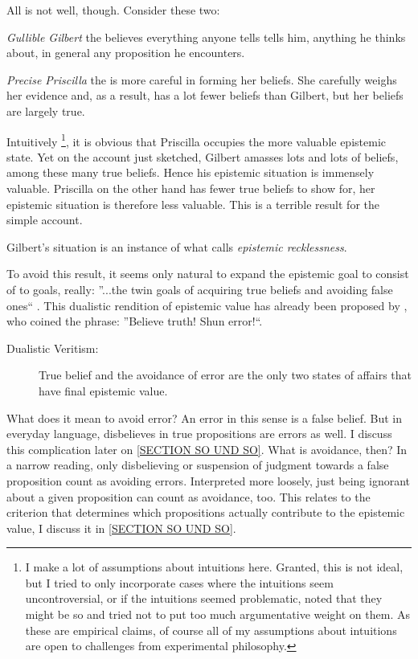\documentclass[12pt,numbers=noenddot]{scrartcl}
\begin{document}
All is not well, though. Consider these two:
\begin{description}
    \item \emph{Gullible Gilbert} the believes everything anyone tells tells him, anything he thinks about, in general any proposition he encounters.
    \item \emph{Precise Priscilla} the is more careful in forming her beliefs. She carefully weighs her evidence and, as a result, has a lot fewer beliefs than Gilbert, but her beliefs are largely true.
\end{description}

Intuitively
\footnote{I make a lot of assumptions about intuitions here. Granted, this is not ideal, but I tried to only incorporate cases where the intuitions seem uncontroversial, or if the intuitions seemed problematic, noted that they might be so and tried not to put too much argumentative weight on them. As these are empirical claims, of course all of my assumptions about intuitions are open to challenges from experimental philosophy.},
it is obvious that Priscilla occupies the more valuable epistemic state. Yet on the account just sketched, Gilbert amasses lots and lots of beliefs, among these many true beliefs. Hence his epistemic situation is immensely valuable. Priscilla on the other hand has fewer true beliefs to show for, her epistemic situation is therefore less valuable. This is a terrible result for the simple account.

Gilbert’s situation is an instance of what \textcite[360]{Berker2013-BERETA-2} calls \emph{epistemic recklessness}. 

To avoid this result, it seems only natural to expand the epistemic goal to consist of to goals, really: ”...the twin goals of acquiring true beliefs and avoiding false ones“ \textcite[339]{Berker2013-BERETA-2}. This dualistic rendition of epistemic value has already been proposed by \textcite[17]{James1896-JAMTWT-19}, who coined the phrase: ”Believe truth! Shun error!“.

\begin{description}
    \item[Dualistic Veritism:] True belief and the avoidance of error are the only two states of affairs that have final epistemic value.
\end{description}
\label{SECTION SO UND SO}
What does it mean to avoid error? An error in this sense \textcite[362]{Berker2013-BERETA-2} is a false belief. But in everyday language, disbelieves in true propositions are errors as well. I discuss this complication later on \ref{SECTION SO UND SO}. What is avoidance, then? In a narrow reading, only disbelieving or suspension of judgment towards a false proposition count as avoiding errors. Interpreted more loosely, just being ignorant about a given proposition can count as avoidance, too. This relates to the criterion that determines which propositions actually contribute to the epistemic value, I discuss it in \ref{SECTION SO UND SO}.
\end{document}
